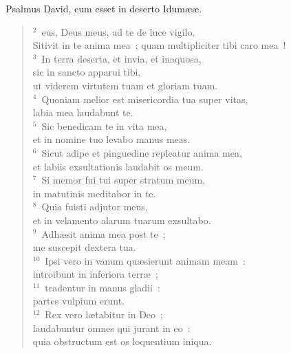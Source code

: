 \bchapter[Psalm]
Psalmus David, cum esset in deserto Idum\ae \ae .
\begin{verse}${}^{2}$~eus, Deus meus, ad te de luce vigilo.\\ Sitivit in te anima mea~; quam multipliciter tibi caro mea~!\\
${}^{3}$~In terra deserta, et invia, et inaquosa,\\ sic in sancto apparui tibi,\\ ut viderem virtutem tuam et gloriam tuam.\\
${}^{4}$~Quoniam melior est misericordia tua super vitas,\\ labia mea laudabunt te.\\
${}^{5}$~Sic benedicam te in vita mea,\\ et in nomine tuo levabo manus meas.\\
${}^{6}$~Sicut adipe et pinguedine repleatur anima mea,\\ et labiis exsultationis laudabit os meum.\\
${}^{7}$~Si memor fui tui super stratum meum,\\ in matutinis meditabor in te.\\
${}^{8}$~Quia fuisti adjutor meus,\\ et in velamento alarum tuarum exsultabo.\\
${}^{9}$~Adh\ae sit anima mea post te~;\\ me suscepit dextera tua.\\
${}^{10}$~Ipsi vero in vanum qu\ae sierunt animam meam~:\\ introibunt in inferiora terr\ae~;\\
${}^{11}$~tradentur in manus gladii~:\\ partes vulpium erunt.\\
${}^{12}$~Rex vero l\ae tabitur in Deo~;\\ laudabuntur omnes qui jurant in eo~:\\ quia obstructum est os loquentium iniqua.\end{verse}



